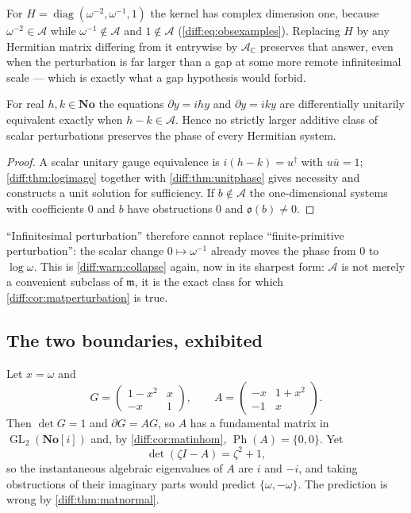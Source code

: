 \documentclass[11pt,letterpaper]{article}
\numberwithin{equation}{section}
\theoremstyle{definition}
\theoremstyle{remark}
\newcommand{\No}{\mathbf{No}}
\newcommand{\SC}{\mathbf{No}[i]}
\newcommand{\C}{\mathbb C}
\newcommand{\der}{\partial}
\newcommand{\mm}{\mathfrak m}
\newcommand{\Acl}{\mathcal A}
\newcommand{\Obs}{\mathfrak o}
\newcommand{\GL}{\operatorname{GL}}
\newcommand{\Ph}{\operatorname{Ph}}
\begin{document}
For $H=\operatorname{diag}(\omega^{-2},\omega^{-1},1)$ the kernel has complex
dimension one, because $\omega^{-2}\in\Acl$ while $\omega^{-1}\notin\Acl$ and
$1\notin\Acl$ (\cref{diff:eq:obsexamples}). Replacing $H$ by any Hermitian
matrix differing from it entrywise by $\Acl_{\C}$ preserves that answer, even
when the perturbation is far larger than a gap at some more remote
infinitesimal scale --- which is exactly what a gap hypothesis would forbid.

\begin{proposition}
\label{diff:prop:sharpperturb}
For real $h,k\in\No$ the equations $\der y=ihy$ and $\der y=iky$ are
differentially unitarily equivalent exactly when $h-k\in\Acl$. Hence no
strictly larger additive class of scalar perturbations preserves the phase of
every Hermitian system.
\end{proposition}
\begin{proof}
A scalar unitary gauge equivalence is $i(h-k)=u^{\dagger}$ with $u\bar u=1$;
\cref{diff:thm:logimage} together with \cref{diff:thm:unitphase} gives
necessity and constructs a unit solution for sufficiency. If $b\notin\Acl$ the
one-dimensional systems with coefficients $0$ and $b$ have obstructions $0$ and
$\Obs(b)\neq0$.
\end{proof}

``Infinitesimal perturbation'' therefore cannot replace ``finite-primitive
perturbation'': the scalar change $0\mapsto\omega^{-1}$ already moves the phase
from $0$ to $\log\omega$. This is \cref{diff:warn:collapse} again, now in its
sharpest form: $\Acl$ is not merely a convenient subclass of $\mm$, it is the
exact class for which \cref{diff:cor:matperturbation} is true.

\subsection{The two boundaries, exhibited}
\label{diff:sub:matboundaries}

\begin{example}
\label{diff:ex:matnonnormal}
Let $x=\omega$ and
\[
 G=\begin{pmatrix}1-x^{2}&x\\-x&1\end{pmatrix},
 \qquad
 A=\begin{pmatrix}-x&1+x^{2}\\-1&x\end{pmatrix}.
\]
Then $\det G=1$ and $\der G=AG$, so $A$ has a fundamental matrix in
$\GL_{2}(\SC)$ and, by \cref{diff:cor:matinhom},
$\Ph(A)=\{0,0\}$. Yet
\[
 \det(\zeta I-A)=\zeta^{2}+1 ,
\]
so the instantaneous algebraic eigenvalues of $A$ are $i$ and $-i$, and taking
obstructions of their imaginary parts would predict $\{\omega,-\omega\}$. The
prediction is wrong by \cref{diff:thm:matnormal}.
\end{example}
\end{document}
